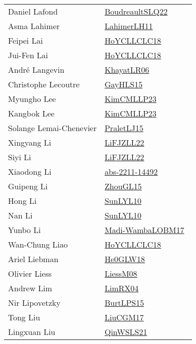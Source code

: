 {\begin{longtable}{p{4cm}p{20cm}}
Daniel Lafond & \href{works/BoudreaultSLQ22.pdf}{BoudreaultSLQ22}~\cite{BoudreaultSLQ22}\\
Asma Lahimer & \href{works/LahimerLH11.pdf}{LahimerLH11}~\cite{LahimerLH11}\\
Feipei Lai & \href{works/HoYCLLCLC18.pdf}{HoYCLLCLC18}~\cite{HoYCLLCLC18}\\
Jui{-}Fen Lai & \href{works/HoYCLLCLC18.pdf}{HoYCLLCLC18}~\cite{HoYCLLCLC18}\\
Andr{\'{e}} Langevin & \href{works/KhayatLR06.pdf}{KhayatLR06}~\cite{KhayatLR06}\\
Christophe Lecoutre & \href{works/GayHLS15.pdf}{GayHLS15}~\cite{GayHLS15}\\
Myungho Lee & \href{works/KimCMLLP23.pdf}{KimCMLLP23}~\cite{KimCMLLP23}\\
Kangbok Lee & \href{works/KimCMLLP23.pdf}{KimCMLLP23}~\cite{KimCMLLP23}\\
Solange Lemai{-}Chenevier & \href{works/PraletLJ15.pdf}{PraletLJ15}~\cite{PraletLJ15}\\
Xingyang Li & \href{works/LiFJZLL22.pdf}{LiFJZLL22}~\cite{LiFJZLL22}\\
Siyi Li & \href{works/LiFJZLL22.pdf}{LiFJZLL22}~\cite{LiFJZLL22}\\
Xiaodong Li & \href{works/abs-2211-14492.pdf}{abs-2211-14492}~\cite{abs-2211-14492}\\
Guipeng Li & \href{works/ZhouGL15.pdf}{ZhouGL15}~\cite{ZhouGL15}\\
Hong Li & \href{works/SunLYL10.pdf}{SunLYL10}~\cite{SunLYL10}\\
Nan Li & \href{works/SunLYL10.pdf}{SunLYL10}~\cite{SunLYL10}\\
Yunbo Li & \href{works/Madi-WambaLOBM17.pdf}{Madi-WambaLOBM17}~\cite{Madi-WambaLOBM17}\\
Wan{-}Chung Liao & \href{works/HoYCLLCLC18.pdf}{HoYCLLCLC18}~\cite{HoYCLLCLC18}\\
Ariel Liebman & \href{works/He0GLW18.pdf}{He0GLW18}~\cite{He0GLW18}\\
Olivier Liess & \href{works/LiessM08.pdf}{LiessM08}~\cite{LiessM08}\\
Andrew Lim & \href{works/LimRX04.pdf}{LimRX04}~\cite{LimRX04}\\
Nir Lipovetzky & \href{works/BurtLPS15.pdf}{BurtLPS15}~\cite{BurtLPS15}\\
Tong Liu & \href{works/LiuCGM17.pdf}{LiuCGM17}~\cite{LiuCGM17}\\
Lingxuan Liu & \href{works/QinWSLS21.pdf}{QinWSLS21}~\cite{QinWSLS21}\\

\end{longtable}}
